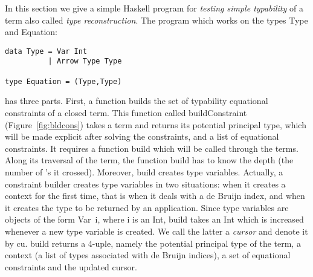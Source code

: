 \documentclass{jfp1}
\begin{document}
In this section we give a simple \textsf{Haskell} program for \emph{testing simple
typability} of a term also called \emph{type reconstruction}.  The program which
works on the types \textsf{Type} and \textsf{Equation}:
\begin{verbatim}
data Type = Var Int
          | Arrow Type Type

type Equation = (Type,Type)            
\end{verbatim}
has three parts. First, a function builds the set of typability equational
constraints of a closed term. This function called \textsf{buildConstraint}
(Figure~\ref{fig:bldcons}) takes a term and returns its potential principal type,
which will be made explicit after solving the constraints, and a list of equational
constraints.  It requires a function \textsf{build} which will be called through the
terms.  Along its traversal of the term, the function \textsf{build} has to know the
depth  (the number of 's it crossed). Moreover, \textsf{build} creates type
variables.  Actually, a constraint builder creates type variables in two situations:
when it creates a context for the first time, that is when it deals with a de Bruijn
index, and when it creates the type to be returned by an application.  Since type
variables are objects of the form \textsf{Var~i}, where \textsf{i} is an
\textsf{Int}, \textsf{build} takes an \textsf{Int} which is increased whenever a new
type variable is created. We call the latter a \emph{cursor} and denote it by
\textsf{cu}. \textsf{build} returns a 4-uple, namely the potential principal type of
the term, a context (a list of types associated with de Bruijn indices), a set of
equational constraints and the updated cursor.
\end{document}
